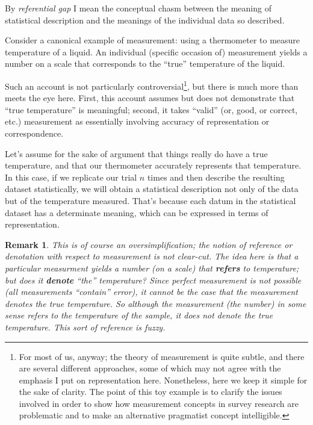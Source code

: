 \documentclass[11pt,twoside]{article}
\newtheorem{remark}{Remark}
\newcommand{\sr}{survey research}
\begin{document}
By \textit{referential gap} I mean the conceptual chasm between the
meaning of statistical description and the meanings of the individual
data so described.

Consider a canonical example of measurement: using a thermometer to
measure temperature of a liquid.  An individual (specific occasion of)
measurement yields a number on a scale that corresponds to the
\enquote{true} temperature of the liquid.

Such an account is not particularly controversial\footnote{For most of
  us, anyway; the theory of measurement is quite subtle, and there are
  several different approaches, some of which may not agree with the
  emphasis I put on representation here.  Nonetheless, here we keep it
  simple for the sake of clarity.  The point of this toy example is to
  clarify the issues involved in order to show how measurement
  concepts in \sr{} are problematic and to make an alternative
  pragmatist concept intelligible.}, but there is much more than meets
the eye here.  First, this account assumes but does not demonstrate
that \enquote{true temperature} is meaningful; second, it takes
\enquote{valid} (or, good, or correct, etc.)  measurement as
essentially involving accuracy of representation or correspondence.

Let's assume for the sake of argument that things really do have a
true temperature, and that our thermometer accurately represents that
temperature.  In this case, if we replicate our trial $n$ times and
then describe the resulting dataset statistically, we will obtain a
statistical description not only of the data but of the temperature
measured.  That's because each datum in the statistical dataset has a
determinate meaning, which can be expressed in terms of
representation.

\begin{remark}
  This is of course an oversimplification; the notion of reference or
  denotation with respect to measurement is not clear-cut.  The idea
  here is that a particular measurment yields a number (on a scale)
  that \textbf{refers} to temperature; but does it \textbf{denote}
  \enquote{the} temperature?  Since perfect measurement is not
  possible (all measurements \enquote{contain} error), it cannot be
  the case that the measurement denotes the true temperature.  So
  although the measurement (the number) in some sense refers to the
  temperature of the sample, it does not denote the true temperature.
  This sort of reference is fuzzy.
\end{remark}
\end{document}
